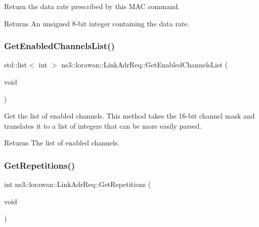 Return the data rate prescribed by this M\+AC command.

\begin{DoxyReturn}{Returns}
An unsigned 8-\/bit integer containing the data rate. 
\end{DoxyReturn}
\mbox{\label{classns3_1_1lorawan_1_1LinkAdrReq_a83aa5c208fb78807413451a87d67b6ec}} 
\subsubsection{\texorpdfstring{Get\+Enabled\+Channels\+List()}{GetEnabledChannelsList()}}
{\footnotesize\ttfamily std\+::list$<$ int $>$ ns3\+::lorawan\+::\+Link\+Adr\+Req\+::\+Get\+Enabled\+Channels\+List (\begin{DoxyParamCaption}\item[{void}]{ }\end{DoxyParamCaption})}

Get the list of enabled channels. This method takes the 16-\/bit channel mask and translates it to a list of integers that can be more easily parsed.

\begin{DoxyReturn}{Returns}
The list of enabled channels. 
\end{DoxyReturn}
\mbox{\label{classns3_1_1lorawan_1_1LinkAdrReq_acc3255bb562164ddd433f929e23a14d8}} 
\subsubsection{\texorpdfstring{Get\+Repetitions()}{GetRepetitions()}}
{\footnotesize\ttfamily int ns3\+::lorawan\+::\+Link\+Adr\+Req\+::\+Get\+Repetitions (\begin{DoxyParamCaption}\item[{void}]{ }\end{DoxyParamCaption})}

